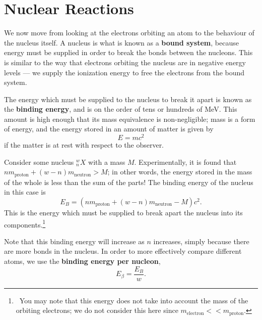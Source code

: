 \documentclass[a4paper]{amsbook}
\theoremstyle{definition}
\numberwithin{exercise}{chapter}
\numberwithin{exercise}{chapter}
\begin{document}
\section{Nuclear Reactions}
We now move from looking at the electrons orbiting an atom to the behaviour of the nucleus itself. A nucleus is what is known as
a \textbf{bound system}, because energy must be supplied in order to break the bonds between the nucleons. This is similar to the
way that electrons orbiting the nucleus are in negative energy levels --- we supply the ionization energy to free the electrons
from the bound system.

The energy which must be supplied to the nucleus to break it apart is known as the \textbf{binding energy}, and is on the order of
tens or hundreds of \si{\mega\electronvolt}. This amount is high enough that its mass equivalence is non-negligible; mass is a form
of energy, and the energy stored in an amount of matter is given by
\begin{equation}
  E = mc^2
\end{equation}
if the matter is at rest with respect to the observer.

Consider some nucleus $ ^w_n X $ with a mass $ M $. Experimentally, it is found that $ nm_{\text{proton}} + (w - n)m_{\text{neutron}} > M $;
in other words, the energy stored in the mass of the whole is less than the sum of the parts! The binding energy of the nucleus in this case is
\begin{equation}
  E_B = (nm_{\text{proton}} + (w - n)m_{\text{neutron}} - M)c^2.
\end{equation}
This is the energy which must be supplied to break apart the nucleus into its components.\footnote{~You may note that this energy does not take into
account the mass of the orbiting electrons; we do not consider this here since $ m_\text{electron} << m_\text{proton} $.}

Note that this binding energy will increase as $ n $ increases, simply because there are more bonds in the nucleus. In order to more effectively
compare different atoms, we use the \textbf{binding energy per nucleon},
\begin{equation}
  E_\beta = \frac{E_B}{w}.
\end{equation}
\end{document}
